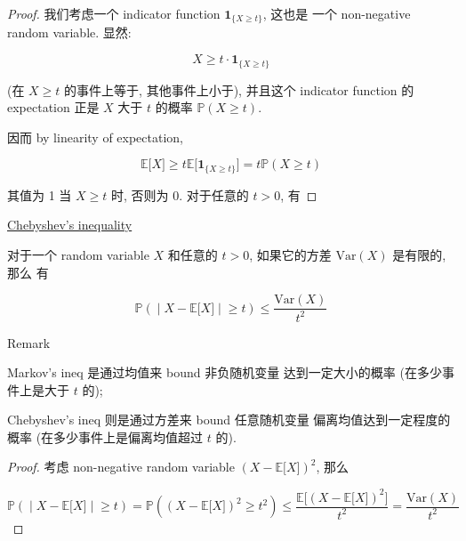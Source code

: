 \documentclass{qlnotes-export}
\begin{document}
\begin{proof}

我们考虑一个 indicator function \(\mathbf{1}_{\{{X \geq t}\}}\), 这也是 一个 non-negative random variable. 显然:

\[X \geq t \cdot \mathbf{1}_{\{{X \geq t}\}}\]

(在 \(X \geq t\) 的事件上等于, 其他事件上小于), 并且这个 indicator function 的 expectation 正是 \(X\) 大于 \(t\) 的概率 \({\mathbb{P}}(X \geq t)\).

因而 by linearity of expectation,

\[{\mathbb{E}}\lbrack X\rbrack \geq t{\mathbb{E}}\lbrack\mathbf{1}_{\{{X \geq t}\}}\rbrack = t{\mathbb{P}}(X \geq t)\]

其值为 1 当 \(X \geq t\) 时, 否则为 0. 对于任意的 \(t > 0\), 有

\end{proof}

\begin{corollary}{\href{https://qiulinfan.github.io/notes/math/measure-theory/\#kn-chebyshev-inequality}{Chebyshev's
inequality}}

对于一个 random variable \(X\) 和任意的 \(t > 0\), 如果它的方差 \(\text{Var}(X)\) 是有限的, 那么 有

\[\left. {\mathbb{P}}( \middle| X - {\mathbb{E}}\lbrack X\rbrack \middle| \geq t) \leq \frac{\text{Var}(X)}{t^{2}} \right.\]

\end{corollary}

\begin{qlremark}{Remark}

Markov's ineq 是通过均值来 bound 非负随机变量 达到一定大小的概率 (在多少事件上是大于 \(t\) 的);

Chebyshev's ineq 则是通过方差来 bound 任意随机变量 偏离均值达到一定程度的概率 (在多少事件上是偏离均值超过 \(t\) 的).

\end{qlremark}

\begin{proof}

考虑 non-negative random variable \((X - {\mathbb{E}}\lbrack X\rbrack)^{2}\), 那么

\[\left. {\mathbb{P}}( \middle| X - {\mathbb{E}}\lbrack X\rbrack \middle| \geq t) = {\mathbb{P}}((X - {\mathbb{E}}\lbrack X\rbrack)^{2} \geq t^{2}) \leq \frac{{\mathbb{E}}\lbrack(X - {\mathbb{E}}\lbrack X\rbrack)^{2}\rbrack}{t^{2}} = \frac{\text{Var}(X)}{t^{2}} \right.\]

\end{proof}
\end{document}
